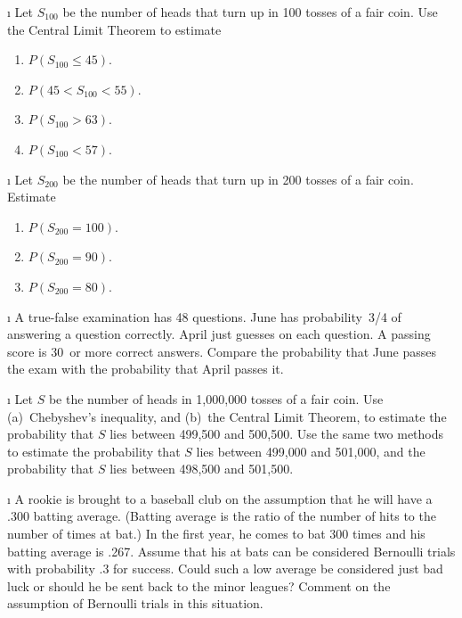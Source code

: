 \exercises
\begin{LJSItem}

\i\label{exer 9.1.1}  Let $S_{100}$ be the number of heads that turn up in 100 tosses of a
fair coin.  Use the Central Limit Theorem to estimate
\begin{enumerate}

\item  $P(S_{100} \leq 45)$.

\item  $P(45 < S_{100} < 55)$.

\item  $P(S_{100} > 63)$.

\item $P(S_{100} < 57)$.
\end{enumerate}

\i\label{exer 9.1.2}  Let $S_{200}$ be the number of heads that turn up in 200 tosses of a
fair coin.  Estimate
\begin{enumerate}

\item  $P(S_{200} = 100)$. 

\item  $P(S_{200} = 90)$. 

\item  $P(S_{200} = 80)$. 
\end{enumerate}

\i\label{exer 9.1.3}  A true-false examination has 48 questions.  June has probability~3/4 of
answering a question correctly.  April just guesses on each question.  A
passing score is 30~or more correct answers.  Compare the probability that June
passes the exam with the probability that April passes it.

\i\label{exer 9.1.4}  Let $S$ be the number of heads in 1{,}000{,}000 tosses of a fair
coin.  Use (a)~Chebyshev's inequality, and (b)~the Central Limit Theorem, to
estimate the probability that $S$ lies between 499{,}500 and 500{,}500.  Use
the same two methods to estimate the probability that $S$ lies between
499{,}000 and 501{,}000, and the probability that $S$ lies between 498{,}500
and 501{,}500.

\i\label{exer 9.1.5}  A rookie is brought to a baseball club on the assumption that he will
have a .300 batting average.  (Batting average is the ratio of the number of
hits to the number of times at bat.)  In the first year, he comes to bat 300
times and his batting average is .267.  Assume that his at bats can be considered
Bernoulli trials with probability .3 for success.  Could such a low average be
considered just bad luck or should he be sent back to the minor leagues? 
Comment on the assumption of Bernoulli trials in this situation.


\end{LJSItem}

